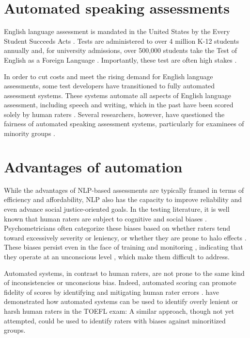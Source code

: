 \documentclass [PhD] {uclathes}
\begin{document}
\section{Automated speaking assessments}

English language assessment is mandated in the United States by the Every Student Succeeds Acts \citep{essa2015}. Tests are administered to over 4 million K-12 students annually \citep{irwin2021report} and, for university admissions, over 500,000 students take the Test of English as a Foreign Language \citep[TOEFL][]{ets2005}. Importantly, these test are often high stakes \citep{cimpian2017}.

In order to cut costs and meet the rising demand for English language assessments, some test developers have transitioned to fully automated assessment systems. These systems automate all aspects of English language assessment, including speech and writing, which in the past have been scored solely by human raters \citep{evanini2017approaches}. Several researchers, however, have questioned the fairness of automated speaking assessment systems, particularly for examinees of minority groups \citep{wang2018monitoring, collier2020test}.

\section{Advantages of automation}

While the advantages of NLP-based assessments are typically framed in terms of efficiency and affordability, NLP also has the capacity to improve reliability and even advance social justice-oriented goals. In the testing literature, it is well known that human raters are subject to cognitive and social biases \citep{engelhard2002monitoring}. Psychometricians often categorize these biases based on whether raters tend toward excessively severity or leniency, or whether they are prone to halo effects \citep{saal1980}. These biases persist even in the face of training and monitoring \citep{engelhard1994examining}, indicating that they operate at an unconscious level \citep{spencer2016}, which make them difficult to address.

Automated systems, in contrast to human raters, are not prone to the same kind of inconsistencies or unconscious bias. Indeed, automated scoring can promote fidelity of scores by identifying and mitigating human rater errors \citep{bejar2011validity}. \citet{wang2018monitoring} have demonstrated how automated systems can be used to identify overly lenient or harsh human raters in the TOEFL exam: A similar approach, though not yet attempted, could be used to identify raters with biases against minoritized groups.
\end{document}

